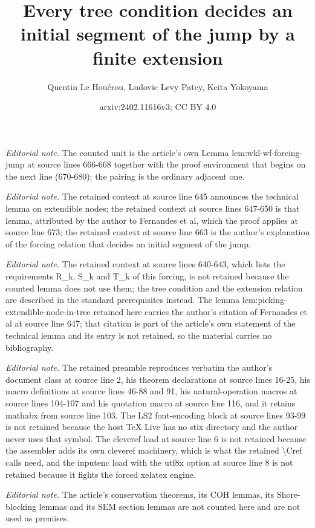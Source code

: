 \documentclass{article}
\title{Every tree condition decides an initial segment of the jump by a finite extension}
\author{Quentin Le Houérou, Ludovic Levy Patey, Keita Yokoyama}
\date{arxiv:2402.11616v3; CC BY 4.0}
\numberwithin{theorem}{section}
\begin{document}
\maketitle
\noindent\textit{Editorial note.} The counted unit is the article's own Lemma lem:wkl-wf-forcing-jump at source lines 666-668 together with the proof environment that begins on the next line (670-680); the pairing is the ordinary adjacent one.\par\medskip
\noindent\textit{Editorial note.} The retained context at source line 645 announces the technical lemma on extendible nodes; the retained context at source lines 647-650 is that lemma, attributed by the author to Fernandes et al, which the proof applies at source line 673; the retained context at source line 663 is the author's explanation of the forcing relation that decides an initial segment of the jump.\par\medskip
\noindent\textit{Editorial note.} The retained context at source lines 640-643, which lists the requirements R\_k, S\_k and T\_k of this forcing, is not retained because the counted lemma does not use them; the tree condition and the extension relation are described in the standard prerequisites instead. The lemma lem:picking-extendible-node-in-tree retained here carries the author's citation of Fernandes et al at source line 647; that citation is part of the article's own statement of the technical lemma and its entry is not retained, so the material carries no bibliography.\par\medskip
\noindent\textit{Editorial note.} The retained preamble reproduces verbatim the author's document class at source line 2, his theorem declarations at source lines 16-25, his macro definitions at source lines 46-88 and 91, his natural-operation macros at source lines 104-107 and his quotation macro at source line 116, and it retains mathabx from source line 103. The LS2 font-encoding block at source lines 93-99 is not retained because the host TeX Live has no stix directory and the author never uses that symbol. The cleveref load at source line 6 is not retained because the assembler adds its own cleveref machinery, which is what the retained \textbackslash{}Cref calls need, and the inputenc load with the utf8x option at source line 8 is not retained because it fights the forced xelatex engine.\par\medskip
\noindent\textit{Editorial note.} The article's conservation theorems, its COH lemmas, its Shore-blocking lemmas and its SEM section lemmas are not counted here and are not used as premises.\par\medskip
\end{document}
